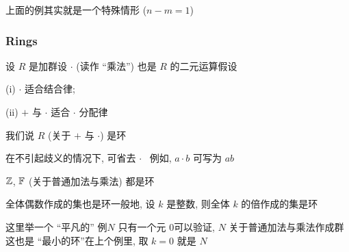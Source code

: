 \begin{remark}
    上面的例其实就是一个特殊情形 ($n - m = 1$)\period
\end{remark}

\subsubsection*{Rings}

\begin{definition}
    设 $R$ 是加群\period 设 $\cdot$ (读作 ``乘法'') 也是 $R$ 的二元运算\period 假设

    (i) $\cdot$ 适合结合律;

    (ii) $+$ 与 $\cdot$ 适合 $\cdot$ 分配律\period

    我们说 $R$ (关于 $+$ 与 $\cdot$) 是环 \period
\end{definition}

\begin{remark}
    在不引起歧义的情况下, 可省去 $\cdot$ \, \period 例如, $a \cdot b$ 可写为 $ab$\period
\end{remark}

\begin{example}
    $\mathbb{Z}$, $\mathbb{F}$ (关于普通加法与乘法) 都是环\period
\end{example}

\begin{example}
    全体偶数作成的集也是环\period 一般地, 设 $k$ 是整数, 则全体 $k$ 的倍作成的集是环\period
\end{example}

\begin{example}
    这里举一个 ``平凡的''  例\period $N$ 只有一个元 $0$\period 可以验证, $N$ 关于普通加法与乘法作成群\period 这也是 ``最小的环''\period 在上个例里, 取 $k=0$ 就是 $N$\period
\end{example}


